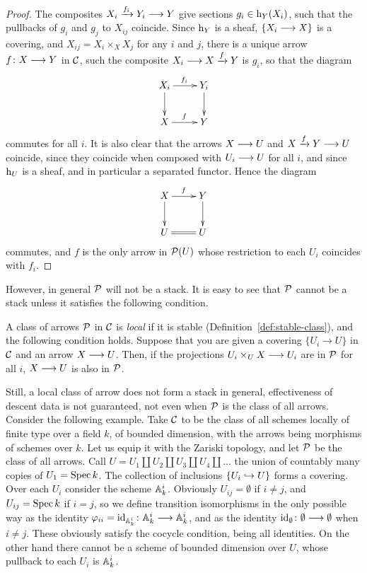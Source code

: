\begin{4   STACKS}
\begin{4.3 Descent for morphisms of schemes}
\begin{proof}
The composites $X_i \xrightarrow{f_i} Y_i \arr  Y$ give sections $g_i \in \h_Y(X_i)$, such that the pullbacks of $g_i$ and $g_j$ to $X_{ij}$ coincide. Since $\h_Y$ is a sheaf, $\{X_i \arr X\}$ is a covering, and $X_{ij} = X_i \times_X X_j$ for any $i$ and $j$, there is a unique arrow $f \colon X \arr Y$ in $\cC$, such the composite $X_i \arr X \xrightarrow{f} Y$ is $g_i$, so that the diagram
   \[
   \xymatrix{
   X_i \ar[r]^{f_i} \ar[d] &
   Y_i \ar[d] \\
   X \ar[r]^f &
   Y
   }
   \]
commutes for all $i$. It is also clear that the arrows $X \arr U$ and $X \xrightarrow{f} Y \arr U$ coincide, since they coincide when composed with $U_i \arr U$ for all $i$, and since $\h_U$ is a sheaf, and in particular a  separated functor. Hence the diagram
   \[
   \xymatrix{
   X \ar[r]^f \ar[d] & Y \ar[d] \\
   U \ar@{=}[r]      & U
   }
   \]
commutes, and $f$ is the only arrow in $\cP(U)$ whose restriction to each $U_i$ coincides with $f_i$.
\end{proof}


However, in general $\cP$ will not be a stack. It is easy to see that $\cP$ cannot be a stack unless it satisfies the following condition.


\begin{definition}\label{def:local-class}
A class of arrows $\cP$ in $\cC$ is \emph{local} if it is stable (Definition~\ref{def:stable-class}), and the following condition holds. Suppose that you are given a covering $\{U_i \to U\}$ in $\cC$ and an arrow $X \arr U$. Then, if the projections $U_i \times_U X \arr U_i$ are in $\cP$ for all $i$, $X \arr U$ is also in $\cP$.
\end{definition}

Still, a local class of arrow does not form a stack in general, effectiveness of descent data is not guaranteed, not even when $\cP$ is the class of all arrows. Consider the following example. Take $\cC$ to be the class of all schemes locally of finite type over a field $k$, of bounded dimension, with the arrows being morphisms of schemes over $k$. Let us equip it with the Zariski topology, and let $\cP$ be the class of all arrows. Call $U = U_1 \coprod U_2 \coprod U_3 \coprod U_4 \coprod \ldots$ the union of countably many copies of $U_1 = \spec k$. The collection of inclusions $\{U_i \into U\}$ forms a covering. Over each $U_i$ consider the scheme $\AA^i_k$. Obviously $U_{ij} = \emptyset$ if $i \neq j$, and $U_{ij} = \spec k$ if $i = j$, so we define transition isomorphisms in the only possible way as the identity $\phi_{ii} = \id_{\AA^i_k} \colon \AA^i_k \arr \AA^i_k$, and as the identity $\id_{\emptyset} \colon \emptyset \arr \emptyset$ when $i \neq j$. These obviously satisfy the cocycle condition, being all identities. On the other hand there cannot be a scheme of bounded dimension over $U$, whose pullback to each $U_i$ is $\AA^i_{k}$.


\end{4.3 Descent for morphisms of schemes}
\end{4   STACKS}
